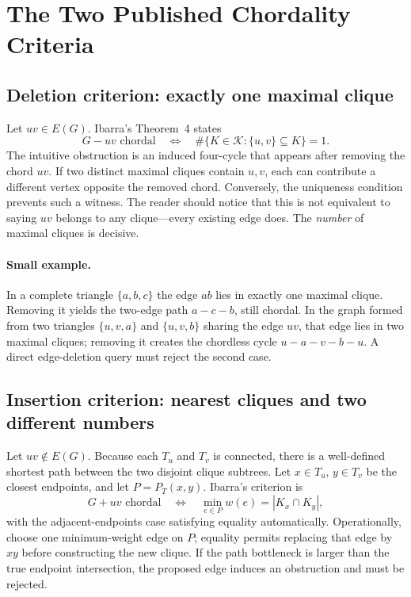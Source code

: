 \section{The Two Published Chordality Criteria}
\label{sec:criteria-detail}
\subsection{Deletion criterion: exactly one maximal clique}
Let \(uv\in E(G)\).  Ibarra's Theorem~4 states
\[
G-uv\text{ chordal}\quad\Longleftrightarrow\quad
\#\{K\in\mathcal K:\{u,v\}\subseteq K\}=1.
\]
The intuitive obstruction is an induced four-cycle that appears after removing the chord \(uv\).  If two distinct maximal cliques contain \(u,v\), each can contribute a different vertex opposite the removed chord.  Conversely, the uniqueness condition prevents such a witness.  The reader should notice that this is not equivalent to saying \(uv\) belongs to any clique---every existing edge does.  The \emph{number} of maximal cliques is decisive.

\paragraph{Small example.} In a complete triangle \(\{a,b,c\}\) the edge \(ab\) lies in exactly one maximal clique.  Removing it yields the two-edge path \(a-c-b\), still chordal.  In the graph formed from two triangles \(\{u,v,a\}\) and \(\{u,v,b\}\) sharing the edge \(uv\), that edge lies in two maximal cliques; removing it creates the chordless cycle \(u-a-v-b-u\).  A direct edge-deletion query must reject the second case.

\subsection{Insertion criterion: nearest cliques and two different numbers}
Let \(uv\notin E(G)\).  Because each \(T_u\) and \(T_v\) is connected, there is a well-defined shortest path between the two disjoint clique subtrees.  Let \(x\in T_u\), \(y\in T_v\) be the closest endpoints, and let \(P=P_T(x,y)\).  Ibarra's criterion is
\[
G+uv\text{ chordal}\quad\Longleftrightarrow\quad
\min_{e\in P}w(e)=|K_x\cap K_y|,
\]
with the adjacent-endpoints case satisfying equality automatically.  Operationally, choose one minimum-weight edge on \(P\); equality permits replacing that edge by \(xy\) before constructing the new clique.  If the path bottleneck is larger than the true endpoint intersection, the proposed edge induces an obstruction and must be rejected.

